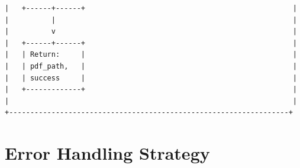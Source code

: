 \documentclass[11pt,a4paper]{article}
\begin{document}
\begin{verbatim}
|   +------+------+                                                 |
|          |                                                        |
|          v                                                        |
|   +------+------+                                                 |
|   | Return:     |                                                 |
|   | pdf_path,   |                                                 |
|   | success     |                                                 |
|   +-------------+                                                 |
|                                                                   |
+------------------------------------------------------------------+
\end{verbatim}

\section{Error Handling Strategy}
\end{document}
